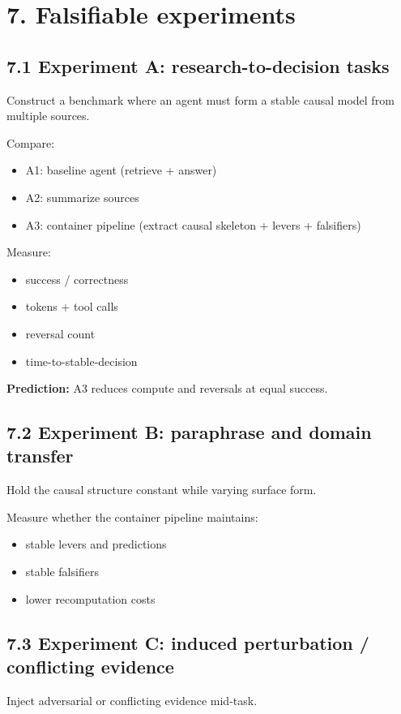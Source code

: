 \documentclass[11pt]{article}
\begin{document}
\section*{7. Falsifiable experiments}

\subsection*{7.1 Experiment A: research-to-decision tasks}
Construct a benchmark where an agent must form a stable causal model from multiple sources.

Compare:
\begin{itemize}
\item A1: baseline agent (retrieve + answer)
\item A2: summarize sources
\item A3: container pipeline (extract causal skeleton + levers + falsifiers)
\end{itemize}

Measure:
\begin{itemize}
\item success / correctness
\item tokens + tool calls
\item reversal count
\item time-to-stable-decision
\end{itemize}

\textbf{Prediction:} A3 reduces compute and reversals at equal success.

\subsection*{7.2 Experiment B: paraphrase and domain transfer}
Hold the causal structure constant while varying surface form.

Measure whether the container pipeline maintains:
\begin{itemize}
\item stable levers and predictions
\item stable falsifiers
\item lower recomputation costs
\end{itemize}

\subsection*{7.3 Experiment C: induced perturbation / conflicting evidence}
Inject adversarial or conflicting evidence mid-task.
\end{document}
